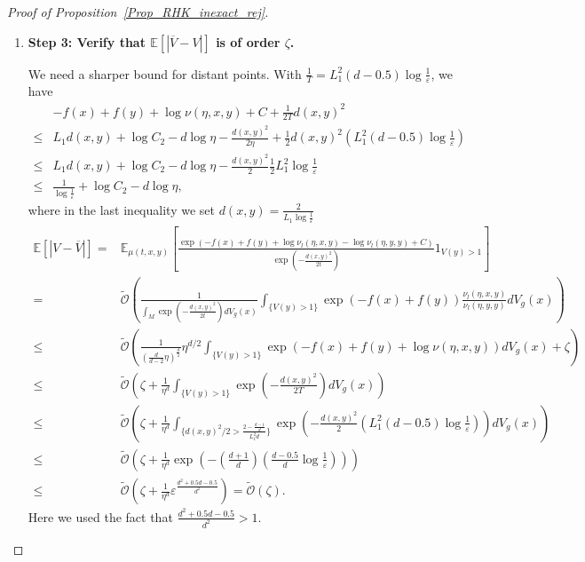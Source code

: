 \begin{proof}[Proof of Proposition~\ref{Prop_RHK_inexact_rej}]
\begin{enumerate}
        \item \textbf{Step 3: Verify that $\mathbb{E}[|\overline{V} - V|]$ is of order $\zeta$.} 
        
        We need a sharper bound for distant points. 
        With $\frac{1}{T} = L_{1}^{2}(d-0.5)\log\frac{1}{\varepsilon}$, we have
        \begin{align*}
                &-f(x) + f(y) + \log \nu(\eta, x, y) + C + \frac{1}{2T}d(x, y)^{2} \\
                \le& L_{1}d(x, y) + \log C_{2} - d\log \eta -\frac{d(x, y)^{2}}{2\eta} + \frac{1}{2}d(x, y)^{2}(L_{1}^{2}(d-0.5)\log \frac{1}{\varepsilon}) \\
                \le& L_{1}d(x, y) + \log C_{2} - d\log \eta - \frac{d(x, y)^{2}}{2} \frac{1}{2}L_{1}^{2} \log \frac{1}{\varepsilon} \\
                \le& \frac{1}{\log \frac{1}{\varepsilon}} + \log C_{2} - d\log \eta,
        \end{align*}
        where in the last inequality we set $d(x, y) = \frac{2}{L_{1} \log \frac{1}{\varepsilon}}$
        \begin{align*}
                \mathbb{E}[|V - \overline{V}|] = &\mathbb{E}_{\mu(t, x, y)}[\frac{\exp(-f(x) + f(y) + \log \nu_{l}(\eta, x, y) - \log \nu_{l}(\eta, y, y) + C)}{\exp(-\frac{d(x, y)^{2}}{2t})} 1_{V(y) > 1}] \\
                = & \tilde{\mathcal{O}}( \frac{1}{\int_{M} \exp(-\frac{d(x, y)^{2}}{2t}) dV_{g}(x)}\int_{\{V(y) > 1\}} 
                \exp(-f(x) + f(y))\frac{\nu_{l}(\eta, x, y)}{\nu_{l}(\eta, y, y)} dV_{g}(x))\\
                \le & \tilde{\mathcal{O}}( \frac{1}{(\frac{d}{d-2}\eta)^{\frac{d}{2}}} 
                \eta^{d/2}
                \int_{\{V(y) > 1\}} \exp(-f(x) + f(y) + \log \nu(\eta, x, y)) dV_{g}(x) + \zeta )\\
                \le & \tilde{\mathcal{O}}( \zeta  + \frac{1}{\eta^{d}}
                \int_{\{V(y) > 1\}} \exp(-\frac{d(x, y)^{2}}{2T}) dV_{g}(x) )\\
                \le & \tilde{\mathcal{O}}( \zeta + 
                \frac{1}{\eta^{d}} \int_{\{d(x, y)^{2}/2 > \frac{2-\frac{d-1}{d}}{L_{1}^{2} d} \}} \exp(-\frac{d(x, y)^{2}}{2}(L_{1}^{2}(d-0.5)\log\frac{1}{\varepsilon})) dV_{g}(x)) \\
                \le & \tilde{\mathcal{O}}(\zeta + \frac{1}{\eta^{d}} \exp(-(\frac{d+1}{d})(\frac{d-0.5}{d}\log\frac{1}{\varepsilon}))) \\
                \le & \tilde{\mathcal{O}}(\zeta  +  \frac{1}{\eta^{d}}\varepsilon^{\frac{d^{2}+0.5d-0.5}{d^{2}}})
                = \tilde{\mathcal{O}}(\zeta).
        \end{align*}
        Here we used the fact that $\frac{d^{2}+0.5d-0.5}{d^{2}} > 1$.
    \end{enumerate}
    
\end{proof}

